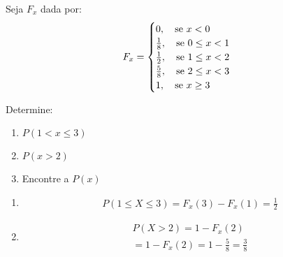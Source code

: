 \begin{description}
\begin{enumerate}[label=(\alph*)]
         \end{enumerate}
       \item  [Exemplo:]
       \item  Seja $F_{x}$ dada por:
         \begin{align*}
           F_{x}=\begin{cases} 
             0, \text{\quad se }x<0 \\
             \frac{1}{8},\text{\quad se }0 \le x <1 \\
             \frac{1}{2}, \text{\quad se }1 \le x < 2 \\
             \frac{5}{8}, \text{\quad se }2 \le x < 3 \\
             1,\quad \text{se } x \geq 3
           \end{cases}
         \end{align*}

         Determine: 
         \begin{enumerate}[label=(\alph*)]
           \item $P(1 < x \le 3)$
           \item $P(x>2)$
           \item Encontre a $P(x)$
         \end{enumerate}
         \begin{enumerate}[label= (\alph*)]
           \item 
             \begin{align*}
               P(1 \le X \le 3)= F_{x}(3) - F_{x}(1) = \frac{1}{2}
             \end{align*}
           \item 
             \begin{align*}
               P( X > 2)=1 - F_{x}(2) \\
               = 1- F_{x}(2)= 1 - \frac{5}{8}= \frac{3}{8}
             \end{align*}


\end{enumerate}
\end{description}
